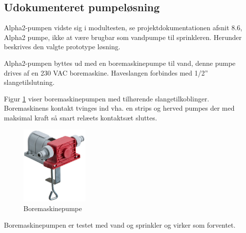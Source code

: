 
\subsection{Udokumenteret pumpeløsning}
\label{sec:Udokumenteretpumpeloesning}

Alpha2-pumpen vidste sig i modultesten, se projektdokumentationen afsnit 8.6, Alpha2 pumpe, ikke at være brugbar som vandpumpe til sprinkleren. Herunder beskrives den valgte prototype løsning.

Alpha2-pumpen byttes ud med en boremaskinepumpe til vand, denne pumpe drives af en 230 VAC boremaskine. Haveslangen forbindes med 1/2'' slangetilslutning. 

Figur \ref{fig:boremaskinepumpe} viser boremaskinepumpen med tilhørende slangetilkoblinger. Boremaskinens kontakt tvinges ind vha. en strips og herved pumpes der med maksimal kraft så snart relæets kontaktsæt sluttes. 

\begin{figure}[h]
  \centering
    \includegraphics[width=0.3\textwidth]{Billeder/boremaskinepumpe}
    \caption{Boremaskinepumpe}
    \label{fig:boremaskinepumpe}
\end{figure}

Boremaskinepumpen er testet med vand og sprinkler og virker som forventet. 